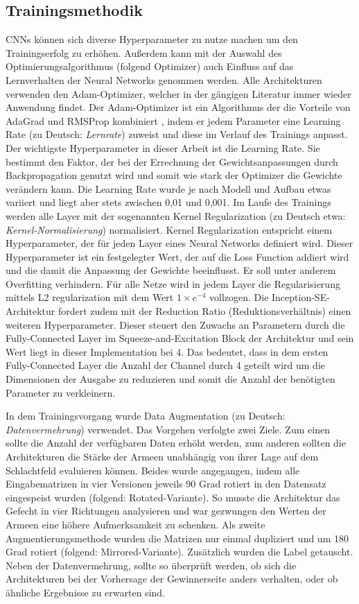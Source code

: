\subsection{Trainingsmethodik}
\label{sek:trainmeth}

CNNs können sich diverse Hyperparameter zu nutze machen um den Trainingserfolg zu erhöhen. Außerdem kann mit der Auswahl des Optimierungsalgorithmus (folgend Optimizer) auch Einfluss auf das Lernverhalten der Neural Networks genommen werden. Alle Architekturen verwenden den Adam-Optimizer, welcher in der gängigen Literatur immer wieder Anwendung findet. Der Adam-Optimizer ist ein Algorithmus der die Vorteile von AdaGrad und RMSProp kombiniert \parencite{DBLP:journals/corr/KingmaB14}, indem er jedem Parameter eine Learning Rate (zu Deutsch: \textit{Lernrate}) zuweist und diese im Verlauf des Trainings anpasst. Der wichtigste Hyperparameter in dieser Arbeit ist die Learning Rate. Sie bestimmt den Faktor, der bei der Errechnung der Gewichtsanpassungen durch Backpropagation genutzt wird und somit wie stark der Optimizer die Gewichte verändern kann. Die Learning Rate wurde je nach Modell und Aufbau etwas variiert und liegt aber stets zwischen 0,01 und 0,001. Im Laufe des Trainings werden alle Layer mit der sogenannten Kernel Regularization (zu Deutsch etwa: \textit{Kernel-Normalisierung}) normalisiert. Kernel Regularization entspricht einem Hyperparameter, der für jeden Layer eines Neural Networks definiert wird. Dieser Hyperparameter ist ein festgelegter Wert, der auf die Loss Function addiert wird und die damit die Anpassung der Gewichte beeinflusst. Er soll unter anderem Overfitting verhindern. Für alle Netze wird in jedem Layer die Regularisierung mittels L2 regularization mit dem Wert  $1\times e^{-4}$ vollzogen. Die Inception-SE-Architektur fordert zudem mit der Reduction Ratio (Reduktionsverhältnis) einen weiteren Hyperparameter. Dieser steuert den Zuwachs an Parametern durch die Fully-Connected Layer im Squeeze-and-Excitation Block der Architektur und sein Wert liegt in dieser Implementation bei 4. Das bedeutet, dass in dem ersten Fully-Connected Layer die Anzahl der Channel durch 4 geteilt wird um die Dimensionen der Ausgabe zu reduzieren und somit die Anzahl der benötigten Parameter zu verkleinern. 

In dem Trainingsvorgang wurde Data Augmentation (zu Deutsch: \textit{Datenvermehrung}) verwendet. Das Vorgehen verfolgte zwei Ziele. Zum einen sollte die Anzahl der verfügbaren Daten erhöht werden, zum anderen sollten die Architekturen die Stärke der Armeen unabhängig von ihrer Lage auf dem Schlachtfeld evaluieren können. Beides wurde angegangen, indem alle Eingabematrizen in vier Versionen jeweils 90 Grad rotiert in den Datensatz eingespeist wurden (folgend: Rotated-Variante). So musste die Architektur das Gefecht in vier Richtungen analysieren und war gezwungen den Werten der Armeen eine höhere Aufmerksamkeit zu schenken. Als zweite Augmentierungsmethode wurden die Matrizen nur einmal dupliziert und um 180 Grad rotiert (folgend: Mirrored-Variante). Zusätzlich wurden die Label getauscht. Neben der Datenvermehrung, sollte so überprüft werden, ob sich die Architekturen bei der Vorhersage der Gewinnerseite anders verhalten, oder ob ähnliche Ergebnisse zu erwarten sind.


